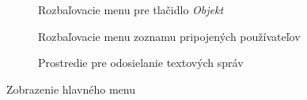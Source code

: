 \begin{figure}
\begin{subfigure}[t]{0.48\linewidth}
		\caption{Rozbaľovacie menu pre tlačidlo \textit{Objekt} }
	\end{subfigure}
	\quad
	\begin{subfigure}[t]{0.48\linewidth}	
		\caption{Rozbaľovacie menu zoznamu pripojených používateľov  }
	\end{subfigure}
	\quad
	\begin{subfigure}[t]{0.6\linewidth}	
		\caption{Prostredie pre odosielanie textových správ}
	\end{subfigure}
	\caption{Zobrazenie hlavného menu}
\end{figure}


